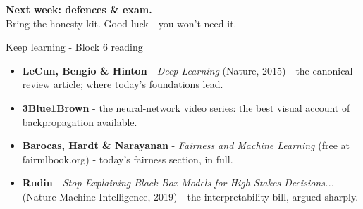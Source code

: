 \documentclass[10pt,aspectratio=169]{beamer}
\begin{document}
\begin{frame}[plain]
  \begin{center}
    \vspace{1.5cm}
    {\LARGE\textbf{Next week: defences \& exam.}}\\[0.6cm]
    {\normalsize Bring the honesty kit. Good luck - you won't need it.}
  \end{center}
\end{frame}

\begin{frame}{Keep learning - Block 6 reading}
  \begin{itemize}
    \item \textbf{LeCun, Bengio \& Hinton} - \emph{Deep Learning} (Nature,
          2015) - the canonical review article; where today's foundations
          lead.
    \item \textbf{3Blue1Brown} - the neural-network video series: the best
          visual account of backpropagation available.
    \item \textbf{Barocas, Hardt \& Narayanan} - \emph{Fairness and Machine
          Learning} (free at fairmlbook.org) - today's fairness section,
          in full.
    \item \textbf{Rudin} - \emph{Stop Explaining Black Box Models for
          High Stakes Decisions...} (Nature Machine Intelligence, 2019) -
          the interpretability bill, argued sharply.
  \end{itemize}
\end{frame}
\end{document}
